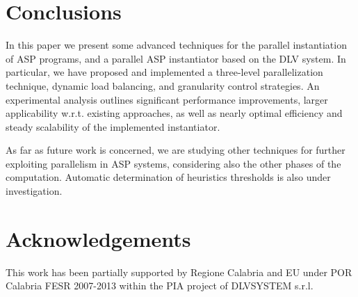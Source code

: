 \documentclass[preprint]{tlp}
\newcommand{\dlv}{{\sc DLV}\xspace}
\begin{document}
\section{Conclusions}\label{sec:conclusion}

In this paper we present some advanced techniques for the parallel instantiation
of ASP programs, and a parallel ASP instantiator based on the \dlv system.
In particular, we have proposed and implemented a three-level parallelization technique, dynamic load balancing, and granularity control strategies.
An experimental analysis outlines significant performance improvements, larger applicability w.r.t. existing approaches,
as well as nearly optimal efficiency and steady scalability of the implemented instantiator.

As far as future work is concerned, we are studying other techniques for further
exploiting parallelism in ASP systems, considering also the other phases of the computation.
Automatic determination of heuristics thresholds is also under investigation.

\section*{Acknowledgements}\label{sec:ack}
This work has been partially supported by Regione Calabria and EU under POR
Calabria FESR 2007-2013 within the PIA project of DLVSYSTEM s.r.l.
\end{document}
